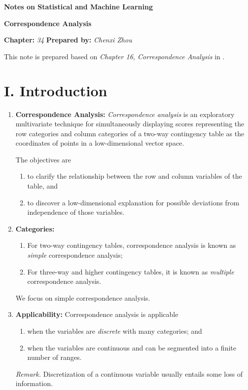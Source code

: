 \documentclass[12pt]{article}
\newcommand{\titlebox}[4]{
\begin{tcolorbox}[colback = blue!5!white!95, colframe = blue!70!black
]
  \noindent \textbf{ #1 } \hfill \textit{#2} 
  \begin{center}
  	 \LARGE{\textbf{#3}}
  \end{center}
\textbf{Chapter:} \textit{#4} \hfill \textbf{Prepared by:} \textit{Chenxi Zhou}
\end{tcolorbox}
}
\begin{document}
\titlebox{Notes on Statistical and Machine Learning}{}{Correspondence Analysis}{34}
\thispagestyle{plain}

\vspace{10pt}

This note is prepared based on \textit{Chapter 16, Correspondence Analysis} in \textcite{Izenman2009-jk}. 

\section*{I. Introduction}

\begin{enumerate}[label=\textbf{\arabic*.}]

	\item \textbf{Correspondence Analysis:} \emph{Correspondence analysis} is an exploratory multivariate technique for simultaneously displaying scores representing the row categories and column categories of a two-way contingency table as the coordinates of points in a low-dimensional vector space. 
	
	The objectives are 
	\begin{enumerate}
		\item to clarify the relationship between the row and column variables of the table, and 
		\item to discover a low-dimensional explanation for possible deviations from independence of those variables. 
	\end{enumerate}
	
	\item \textbf{Categories:}
	\begin{enumerate}
		\item For two-way contingency tables, correspondence analysis is known as \emph{simple} correspondence analysis; 
		\item For three-way and higher contingency tables, it is known as \emph{multiple} correspondence analysis. 
	\end{enumerate}
	We focus on simple correspondence analysis. 
	
	\item \textbf{Applicability:} Correspondence analysis is applicable 
	\begin{enumerate}
		\item when the variables are \emph{discrete} with many categories; and 
		\item when the variables are continuous and can be segmented into a finite number of ranges. 
	\end{enumerate}
	
	\textit{Remark.} Discretization of a continuous variable usually entails some loss of information. 

\end{enumerate}
\end{document}
